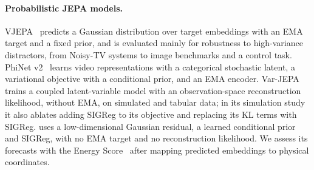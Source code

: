 \paragraph{Probabilistic JEPA models.} VJEPA~\citep{huang2026vjepa} predicts a Gaussian distribution over target embeddings with an EMA target and a fixed prior, and is evaluated mainly for robustness to high-variance distractors, from Noisy-TV systems to image benchmarks and a control task. PhiNet v2~\citep{yamada2026phinetv2} learns video representations with a categorical stochastic latent, a variational objective with a conditional prior, and an EMA encoder. Var-JEPA~\citep{gogl2026varjepa} trains a coupled latent-variable model with an observation-space reconstruction likelihood, without EMA, on simulated and tabular data; in its simulation study it also ablates adding SIGReg to its objective and replacing its KL terms with SIGReg. \shvar{} uses a low-dimensional Gaussian residual, a learned conditional prior and SIGReg, with no EMA target and no reconstruction likelihood. We assess its forecasts with the Energy Score~\citep{gneiting2007scoring} after mapping predicted embeddings to physical coordinates.
